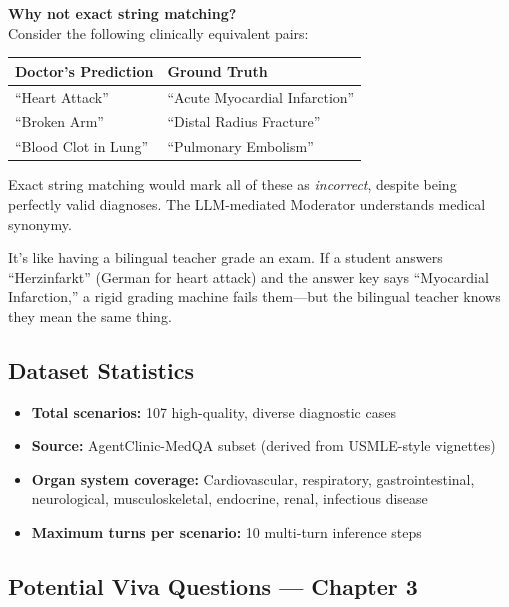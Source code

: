 \textbf{Why not exact string matching?}\\
Consider the following clinically equivalent pairs:
\begin{center}
\begin{tabular}{@{}ll@{}}
\toprule
\textbf{Doctor's Prediction} & \textbf{Ground Truth} \\
\midrule
``Heart Attack'' & ``Acute Myocardial Infarction'' \\
``Broken Arm'' & ``Distal Radius Fracture'' \\
``Blood Clot in Lung'' & ``Pulmonary Embolism'' \\
\bottomrule
\end{tabular}
\end{center}
Exact string matching would mark all of these as \textit{incorrect}, despite being perfectly valid diagnoses. The LLM-mediated Moderator understands medical synonymy.

\begin{analogybox}[\textcolor{white}{Simple Analogy}]
It's like having a bilingual teacher grade an exam. If a student answers ``Herzinfarkt'' (German for heart attack) and the answer key says ``Myocardial Infarction,'' a rigid grading machine fails them---but the bilingual teacher knows they mean the same thing.
\end{analogybox}

\subsection{Dataset Statistics}

\begin{itemize}
    \item \textbf{Total scenarios:} 107 high-quality, diverse diagnostic cases
    \item \textbf{Source:} AgentClinic-MedQA subset (derived from USMLE-style vignettes)
    \item \textbf{Organ system coverage:} Cardiovascular, respiratory, gastrointestinal, neurological, musculoskeletal, endocrine, renal, infectious disease
    \item \textbf{Maximum turns per scenario:} 10 multi-turn inference steps
\end{itemize}

\subsection{Potential Viva Questions --- Chapter 3}

